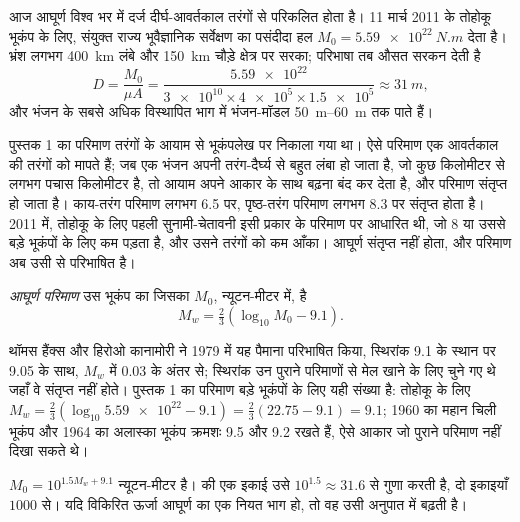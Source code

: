 आज आघूर्ण विश्व भर में दर्ज दीर्घ-आवर्तकाल तरंगों से परिकलित होता है। 11 मार्च 2011 के तोहोकू भूकंप के लिए, संयुक्त राज्य भूवैज्ञानिक सर्वेक्षण का पसंदीदा हल $M_0 = \qty{5.59e22}{N.m}$ देता है। भ्रंश लगभग \qty{400}{km} लंबे और \qty{150}{km} चौड़े क्षेत्र पर सरका; परिभाषा तब औसत सरकन देती है
\[
  D = \frac{M_0}{\mu A}
    = \frac{\num{5.59e22}}{\num{3e10}\times\num{4e5}\times\num{1.5e5}}
    \approx \qty{31}{m} ,
\]
और भंजन के सबसे अधिक विस्थापित भाग में भंजन-मॉडल \qtyrange{50}{60}{m} तक पाते हैं।

पुस्तक 1 का परिमाण तरंगों के आयाम से भूकंपलेख पर निकाला गया था। ऐसे परिमाण एक आवर्तकाल की तरंगों को मापते हैं; जब एक भंजन अपनी तरंग-दैर्घ्य से बहुत लंबा हो जाता है, जो कुछ किलोमीटर से लगभग पचास किलोमीटर है, तो आयाम अपने आकार के साथ बढ़ना बंद कर देता है, और परिमाण संतृप्त हो जाता है। काय-तरंग परिमाण लगभग 6.5 पर, पृष्ठ-तरंग परिमाण लगभग 8.3 पर संतृप्त होता है। 2011 में, तोहोकू के लिए पहली सुनामी-चेतावनी इसी प्रकार के परिमाण पर आधारित थी, जो 8 या उससे बड़े भूकंपों के लिए कम पड़ता है, और उसने तरंगों को कम आँका। आघूर्ण संतृप्त नहीं होता, और परिमाण अब उसी से परिभाषित है।

\begin{definition}[आघूर्ण परिमाण]
\label{def:b1:earthquake-source:mw}
\emph{आघूर्ण परिमाण} उस भूकंप का जिसका  $M_0$, न्यूटन-मीटर में, है
\[
  M_w = \tfrac23\left(\log_{10} M_0 - 9.1\right) .
\]
\end{definition}

थॉमस हैंक्स और हिरोओ कानामोरी ने 1979 में यह पैमाना परिभाषित किया, स्थिरांक 9.1 के स्थान पर 9.05 के साथ, $M_w$ में 0.03 के अंतर से; स्थिरांक उन पुराने परिमाणों से मेल खाने के लिए चुने गए थे जहाँ वे संतृप्त नहीं होते। पुस्तक 1 का परिमाण बड़े भूकंपों के लिए यही संख्या है: तोहोकू के लिए $M_w = \tfrac23(\log_{10}\num{5.59e22} - 9.1) = \tfrac23(22.75 - 9.1) = 9.1$; 1960 का महान चिली भूकंप और 1964 का अलास्का भूकंप क्रमशः 9.5 और 9.2  रखते हैं, ऐसे आकार जो पुराने परिमाण नहीं दिखा सकते थे।

\begin{proposition}[एक परिमाण-इकाई]
\label{prop:b1:earthquake-source:moment-steps}
 $M_0 = 10^{1.5 M_w + 9.1}$ न्यूटन-मीटर है।  की एक इकाई उसे $10^{1.5} \approx 31.6$ से गुणा करती है, दो इकाइयाँ $1000$ से। यदि विकिरित ऊर्जा आघूर्ण का एक नियत भाग हो, तो वह उसी अनुपात में बढ़ती है।
\end{proposition}

